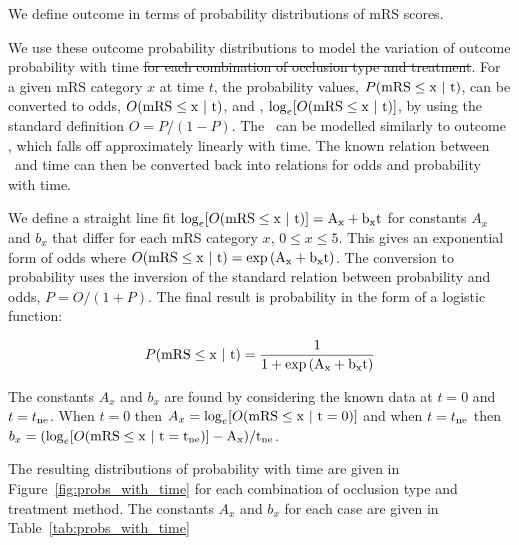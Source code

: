 


We define outcome in terms of probability distributions of mRS scores. 


We use these outcome probability distributions to model the variation of outcome probability with time \sout{for each combination of occlusion type and treatment}.
% 
For a given mRS category $x$ at time $t$, the probability values, $P(\mRS\leq x\ |\ t)$, can be converted to odds, $O(\rm{mRS}\leq x\ |\ t)$, and \logodds, $\log_e[O(\rm{mRS}\leq x\ |\ t)]$, by using the standard definition $O=P/(1-P)$.
The \logodds\ can be modelled similarly to outcome \logoddsratio, which falls off approximately linearly with time\cite{emberson_effect_2014, fransen_time_2016}. 
% 
The known relation between \logodds\ and time can then be converted back into relations for odds and probability with time.

We define a straight line fit $\log_e[O(\rm{mRS}\leq x\ |\ t)] = A_x + b_x t$
for constants $A_x$ and $b_x$ that differ for each mRS category $x$, $0\leq x \leq5$.
This gives an exponential form of odds where $O(\rm{mRS}\leq x\ |\ t) = \exp{(A_x + b_x t)}$.
The conversion to probability uses the inversion of the standard relation between probability and odds,  $P=O/(1+P)$. 
The final result is probability in the form of a logistic function:

\begin{equation}
P(\rm{mRS}\leq x\ |\ t) = \frac{1}{1+\exp{(A_x + b_x t)}}
\end{equation}


The constants $A_x$ and $b_x$ are found by considering the known data at $t=0$ and $t=t_\mathrm{ne}$. 
When $t=0$ then $A_x = \log_e[O(\mRS\leq x\ |\ t=0)]$ and when $t=t_\mathrm{ne}$ then $b_x = (\log_e[O(\rm{mRS}\leq x\ |\ t=t_\mathrm{ne})] - A_x) / t_\mathrm{ne}$. 

The resulting distributions of probability with time are given in Figure~\ref{fig:probs_with_time} for each combination of occlusion type and treatment method.  The constants $A_x$ and $b_x$ for each case are given in Table~\ref{tab:probs_with_time} 

